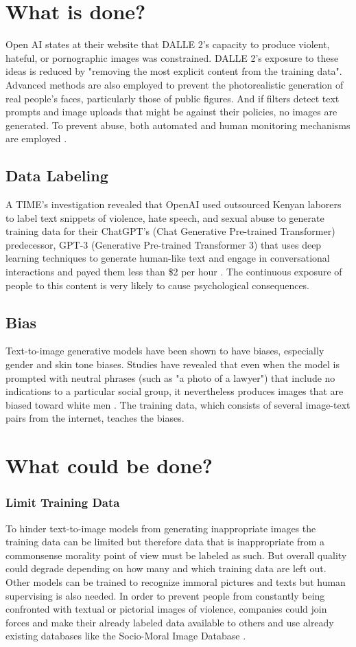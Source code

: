 \documentclass[9.5pt,twocolumn,twoside]{osajnl}
\begin{document}
\section{What is done?}
Open AI states at their website that DALLE 2's capacity to produce violent, hateful, or pornographic images was constrained. DALLE 2's exposure to these ideas is reduced by "removing the most explicit content from the training data". Advanced methods are also employed to prevent the photorealistic generation of real people's faces, particularly those of public figures.
And if filters detect text prompts and image uploads that might be against their policies, no images are generated. To prevent abuse, both automated and human monitoring mechanisms are employed \cite{DallE}. \\
\subsection{Data Labeling}
A TIME's investigation revealed that OpenAI used outsourced Kenyan laborers to label text snippets of violence, hate speech, and sexual abuse to generate training data for their ChatGPT’s (Chat Generative Pre-trained Transformer) predecessor, GPT-3 (Generative Pre-trained Transformer 3) that uses deep learning techniques to generate human-like text and engage in conversational interactions and payed them less than \$2 per hour \cite{KenyaExclusive}. The continuous exposure of people to this content is very likely to cause psychological consequences.
\subsection{Bias}
Text-to-image generative models have been shown to have biases, especially gender and skin tone biases.
Studies have revealed that even when the model is prompted with neutral phrases (such as "a photo of a lawyer") that include no indications to a particular social group, it nevertheless produces images that are biased toward white men \cite{DallEval}.
The training data, which consists of several image-text pairs from the internet, teaches the biases.


\section{What could be done?}
\subsubsection*{Limit Training Data}
To hinder text-to-image models from generating inappropriate images the training data can be limited but therefore data that is inappropriate from a commonsense morality  point of view must be labeled as such. But overall quality could degrade depending on how many and which training data are left out.\\
Other models can be trained to recognize immoral pictures and texts but human supervising is also needed.
In order to prevent people from constantly being confronted with textual or pictorial images of violence, companies could join forces and make their already labeled data available to others and use already existing databases like the Socio-Moral Image Database \cite{Database}.
\end{document}
